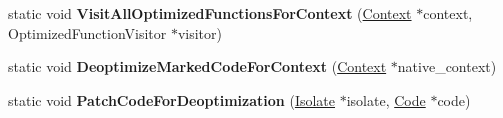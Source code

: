 \begin{DoxyCompactItemize}
\item 
static void {\bfseries Visit\+All\+Optimized\+Functions\+For\+Context} (\hyperlink{classv8_1_1internal_1_1_context}{Context} $\ast$context, Optimized\+Function\+Visitor $\ast$visitor)\hypertarget{classv8_1_1internal_1_1_deoptimizer_a7848f6ccb82c2053d3d3d7bc53254651}{}\label{classv8_1_1internal_1_1_deoptimizer_a7848f6ccb82c2053d3d3d7bc53254651}

\item 
static void {\bfseries Deoptimize\+Marked\+Code\+For\+Context} (\hyperlink{classv8_1_1internal_1_1_context}{Context} $\ast$native\+\_\+context)\hypertarget{classv8_1_1internal_1_1_deoptimizer_ad69f4fc18bd43a09aaf84fffcee49da1}{}\label{classv8_1_1internal_1_1_deoptimizer_ad69f4fc18bd43a09aaf84fffcee49da1}

\item 
static void {\bfseries Patch\+Code\+For\+Deoptimization} (\hyperlink{classv8_1_1internal_1_1_isolate}{Isolate} $\ast$isolate, \hyperlink{classv8_1_1internal_1_1_code}{Code} $\ast$code)\hypertarget{classv8_1_1internal_1_1_deoptimizer_a5d5481e03ca1c99c5f7dfadbb53d00ed}{}\label{classv8_1_1internal_1_1_deoptimizer_a5d5481e03ca1c99c5f7dfadbb53d00ed}

\end{DoxyCompactItemize}
